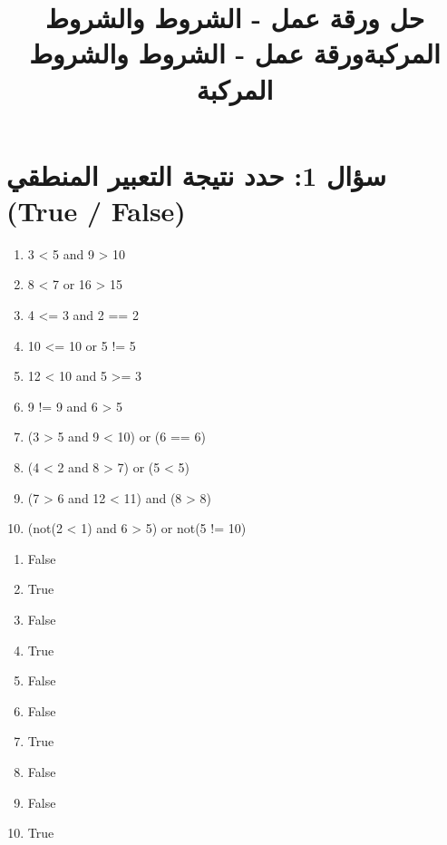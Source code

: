 \documentclass[14pt]{extarticle}
\title{حل ورقة عمل - الشروط والشروط المركبة}
\title{ورقة عمل - الشروط والشروط المركبة}
\begin{document}
\maketitle
\thispagestyle{fancy}

\section*{سؤال 1: حدد نتيجة التعبير المنطقي (\textenglish{True / False})}
\begin{english}
\begin{enumerate}[label=\arabic*), itemsep=1em]
    \item \textenglish{3 < 5 and 9 > 10}
    \item \textenglish{8 < 7 or 16 > 15}
    \item \textenglish{4 <= 3 and 2 == 2}
    \item \textenglish{10 <= 10 or 5 != 5}
    \item \textenglish{12 < 10 and 5 >= 3}
    \item \textenglish{9 != 9 and 6 > 5}
    \item \textenglish{(3 > 5 and 9 < 10) or (6 == 6)}
    \item \textenglish{(4 < 2 and 8 > 7) or (5 < 5)}
    \item \textenglish{(7 > 6 and 12 < 11) and (8 > 8)}
    \item \textenglish{(not(2 < 1) and 6 > 5) or not(5 != 10)}
\end{enumerate}
\end{english}

\ifwithsols
\begin{boxSolution}
\begin{english}
\begin{enumerate}[label=\arabic*)]
    \item \textenglish{False}
    \item \textenglish{True}
    \item \textenglish{False}
    \item \textenglish{True}
    \item \textenglish{False}
    \item \textenglish{False}
    \item \textenglish{True}
    \item \textenglish{False}
    \item \textenglish{False}
    \item \textenglish{True}
\end{enumerate}
\end{english}
\end{boxSolution}
\fi
\clearpage
\end{document}
